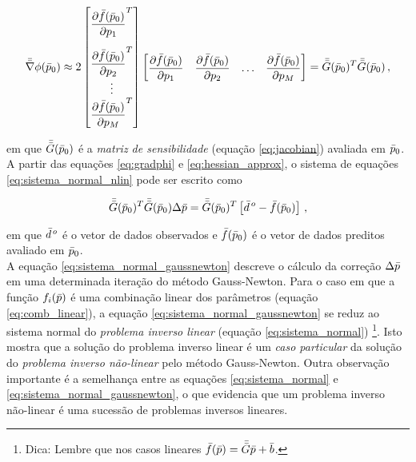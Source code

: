\begin{equation}
\mat{\nabla}\phi(\vect{p}_0) \approx
    2
    \begin{bmatrix}
    \dfrac{\partial\vect{f}(\vect{p}_0)}{\partial p_1}^T \vspace{0.3cm}\\
    \dfrac{\partial\vect{f}(\vect{p}_0)}{\partial p_2}^T \\
    \vdots \\
    \dfrac{\partial\vect{f}(\vect{p}_0)}{\partial p_M}^T
    \end{bmatrix}
    \begin{bmatrix}
    \dfrac{\partial\vect{f}(\vect{p}_0)}{\partial p_1} &
    \dfrac{\partial\vect{f}(\vect{p}_0)}{\partial p_2} &
    \ldots &
    \dfrac{\partial\vect{f}(\vect{p}_0)}{\partial p_M}
    \end{bmatrix}
    =
    \mat{G}(\vect{p}_0)^T\mat{G}(\vect{p}_0) \thinspace ,
\label{eq:hessian_approx}
\end{equation}

\noindent em que $\bar{\bar{G}}(\bar{p}_0)$ é a {\it matriz de sensibilidade}
(equação \ref{eq:jacobian}) avaliada em $\bar{p}_0$.
\\
\indent A partir das equações \ref{eq:gradphi} e \ref{eq:hessian_approx}, o
sistema de equações \ref{eq:sistema_normal_nlin} pode ser escrito como

\begin{equation}
    \bar{\bar{G}}(\bar{p}_0)^T\bar{\bar{G}}(\bar{p}_0)\Delta\bar{p} =
        \bar{\bar{G}}(\bar{p}_0)^T \left[
            \bar{d}^{\thinspace o} - \bar{f}(\bar{p}_0) \right]
    \thinspace ,
\label{eq:sistema_normal_gaussnewton}
\end{equation}

\noindent em que $\bar{d}^{\thinspace o}$ é o vetor de dados observados e
$\bar{f}(\bar{p}_0)$ é o vetor de dados preditos avaliado em $\bar{p}_0$.
\\
\indent A equação \ref{eq:sistema_normal_gaussnewton} descreve o cálculo da
correção $\Delta\bar{p}$ em uma determinada iteração do método Gauss-Newton.
Para o caso em que a função $f_i(\bar{p})$ é uma combinação linear dos
parâmetros (equação \ref{eq:comb_linear}), a equação
\ref{eq:sistema_normal_gaussnewton} se reduz ao sistema
normal do {\it problema inverso linear} (equação \ref{eq:sistema_normal})
\footnote{Dica: Lembre que nos casos lineares $\bar{f}(\bar{p})=\bar{\bar{G}}\bar{p}+\bar{b}$.}.
Isto mostra que a solução do problema inverso linear é um {\it caso particular}
da solução do {\it problema inverso não-linear} pelo método Gauss-Newton.
Outra observação importante é a semelhança entre as equações
\ref{eq:sistema_normal} e \ref{eq:sistema_normal_gaussnewton}, o que evidencia
que um problema inverso não-linear é uma sucessão de problemas inversos lineares.

